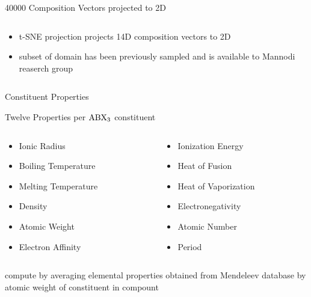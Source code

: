 \documentclass[10pt, aspectratio=169, presentation]{beamer}
\begin{document}
\begin{frame}[label={sec:org9c27d2a}]{40000 Composition Vectors projected to 2D}
\begin{columns}
\begin{column}{0.4\columnwidth}
\begin{itemize}
\item t-SNE projection projects 14D composition vectors to 2D
\item subset of domain has been previously sampled and is available to
Mannodi reaserch group
\autocite{yang-2023-high-throug}
\end{itemize}
\end{column}

\begin{column}{0.6\columnwidth}
 
\begin{center}

\end{center}
\end{column}
\end{columns}
\end{frame}

\begin{frame}[label={sec:orgdd89636}]{Constituent Properties}
\begin{block}{Twelve Properties per \(\ce{ABX_3}\) constituent}
\begin{columns}
\begin{column}{0.5\columnwidth}
\begin{itemize}
\item Ionic Radius
\item Boiling Temperature
\item Melting Temperature
\item Density
\item Atomic Weight
\item Electron Affinity
\end{itemize}
\end{column}
\begin{column}{0.5\columnwidth}
\begin{itemize}
\item Ionization Energy
\item Heat of Fusion
\item Heat of Vaporization
\item Electronegativity
\item Atomic Number
\item Period
\end{itemize}
\end{column}
\end{columns}
\end{block}

compute by averaging elemental properties obtained from Mendeleev database
\autocite{mentel-2014}
by atomic weight of constituent in compount
\end{frame}
\end{document}
